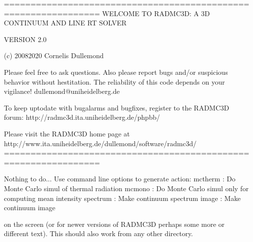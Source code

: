 \documentclass[letterpaper,10pt,english]{sphinxmanual}
\begin{document}
\begin{sphinxVerbatim}[commandchars=\\\{\}]
================================================================
     WELCOME TO RADMC\PYGZhy{}3D: A 3\PYGZhy{}D CONTINUUM AND LINE RT SOLVER

                         VERSION 2.0

               (c) 2008\PYGZhy{}2020 Cornelis Dullemond

      Please feel free to ask questions. Also please report
       bugs and/or suspicious behavior without hestitation.
     The reliability of this code depends on your vigilance!
                   dullemond@uni\PYGZhy{}heidelberg.de

  To keep up\PYGZhy{}to\PYGZhy{}date with bug\PYGZhy{}alarms and bugfixes, register to
                    the RADMC\PYGZhy{}3D forum:
           http://radmc3d.ita.uni\PYGZhy{}heidelberg.de/phpbb/

             Please visit the RADMC\PYGZhy{}3D home page at
 http://www.ita.uni\PYGZhy{}heidelberg.de/\PYGZti{}dullemond/software/radmc\PYGZhy{}3d/
================================================================

Nothing to do... Use command line options to generate action:
  mctherm        : Do Monte Carlo simul of thermal radiation
  mcmono         : Do Monte Carlo simul only for computing mean intensity
  spectrum       : Make continuum spectrum
  image          : Make continuum image
\end{sphinxVerbatim}

on the screen (or for newer versions of RADMC\sphinxhyphen{}3D perhaps some more
or different text). This should also work from any other directory.
\end{document}
